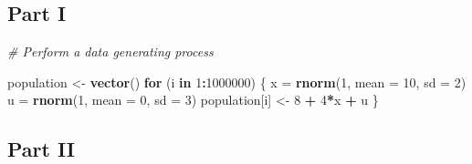 \documentclass[]{article}
\newenvironment{Shaded}{\begin{snugshade}}{\end{snugshade}}
\newcommand{\KeywordTok}[1]{\textcolor[rgb]{0.13,0.29,0.53}{\textbf{#1}}}
\newcommand{\DataTypeTok}[1]{\textcolor[rgb]{0.13,0.29,0.53}{#1}}
\newcommand{\DecValTok}[1]{\textcolor[rgb]{0.00,0.00,0.81}{#1}}
\newcommand{\StringTok}[1]{\textcolor[rgb]{0.31,0.60,0.02}{#1}}
\newcommand{\CommentTok}[1]{\textcolor[rgb]{0.56,0.35,0.01}{\textit{#1}}}
\newcommand{\ControlFlowTok}[1]{\textcolor[rgb]{0.13,0.29,0.53}{\textbf{#1}}}
\newcommand{\OperatorTok}[1]{\textcolor[rgb]{0.81,0.36,0.00}{\textbf{#1}}}
\newcommand{\NormalTok}[1]{#1}
\begin{document}
\subsection{Part I}\label{part-i-1}

\begin{Shaded}
\begin{Highlighting}[]
\CommentTok{# Perform a data generating process }

\NormalTok{population <-}\StringTok{ }\KeywordTok{vector}\NormalTok{()}
\ControlFlowTok{for}\NormalTok{ (i }\ControlFlowTok{in} \DecValTok{1}\OperatorTok{:}\DecValTok{1000000}\NormalTok{) \{}
\NormalTok{  x =}\StringTok{ }\KeywordTok{rnorm}\NormalTok{(}\DecValTok{1}\NormalTok{, }\DataTypeTok{mean =} \DecValTok{10}\NormalTok{, }\DataTypeTok{sd =} \DecValTok{2}\NormalTok{)}
\NormalTok{  u =}\StringTok{ }\KeywordTok{rnorm}\NormalTok{(}\DecValTok{1}\NormalTok{, }\DataTypeTok{mean =} \DecValTok{0}\NormalTok{, }\DataTypeTok{sd =} \DecValTok{3}\NormalTok{)}
\NormalTok{  population[i] <-}\StringTok{ }\DecValTok{8} \OperatorTok{+}\StringTok{ }\DecValTok{4}\OperatorTok{*}\NormalTok{x }\OperatorTok{+}\StringTok{ }\NormalTok{u }
\NormalTok{\}}
\end{Highlighting}
\end{Shaded}

\subsection{Part II}\label{part-ii-1}
\end{document}
